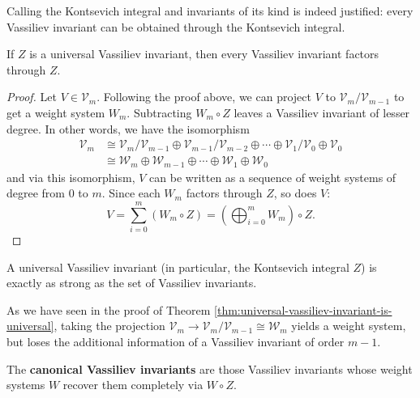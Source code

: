 Calling the Kontsevich integral and invariants of its kind is indeed justified: every Vassiliev invariant can be obtained through the Kontsevich integral.

\begin{theorem}
	\label{thm:universal-vassiliev-invariant-is-universal}
	If \(Z\) is a universal Vassiliev invariant, then every Vassiliev invariant factors through \(Z\).
\end{theorem}

\begin{proof}
	Let \(V \in \mathcal{V}_{m}\). Following the proof above, we can project \(V\) to \(\mathcal{V}_{m} / \mathcal{V}_{m - 1}\) to get a weight system \(W_{m}\). Subtracting \(W_{m} \circ Z\) leaves a Vassiliev invariant of lesser degree. In other words, we have the isomorphism
	\begin{align*}
		\mathcal{V}_{m}
		& \cong \mathcal{V}_{m}/\mathcal{V}_{m - 1} \oplus \mathcal{V}_{m - 1} / \mathcal{V}_{m - 2} \oplus \cdots \oplus \mathcal{V}_{1} / \mathcal{V}_{0} \oplus \mathcal{V}_{0}\\
		& \cong \mathcal{W}_{m} \oplus \mathcal{W}_{m - 1} \oplus \cdots \oplus \mathcal{W}_{1} \oplus \mathcal{W}_{0}
	\end{align*}
	and via this isomorphism, \(V\) can be written as a sequence of weight systems of degree from \(0\) to \(m\). Since each \(W_{m}\) factors through \(Z\), so does \(V\):
	\[V = \sum_{i = 0}^{m} (W_{m} \circ Z) = \left(\bigoplus_{i = 0}^{m} W_{m}\right) \circ Z.\]
\end{proof}

\begin{corollary}
	A universal Vassiliev invariant (in particular, the Kontsevich integral \(Z\)) is exactly as strong as the set of Vassiliev invariants.
\end{corollary}

As we have seen in the proof of Theorem \ref{thm:universal-vassiliev-invariant-is-universal}, taking the projection \(\mathcal{V}_{m} \to \mathcal{V}_{m}/\mathcal{V}_{m - 1} \cong \mathcal{W}_{m}\) yields a weight system, but loses the additional information of a Vassiliev invariant of order \(m - 1\).

\begin{definition}
	 The \textbf{canonical Vassiliev invariants} are those Vassiliev invariants whose weight systems \(W\) recover them completely via \(W \circ Z\).
\end{definition}

